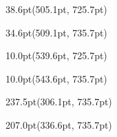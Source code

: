 \documentclass{article}
\begin{document}
\begin{textblock*}{38.6pt}(505.1pt, 725.7pt)%
\noindent%
%
\end{textblock*}
\begin{textblock*}{34.6pt}(509.1pt, 735.7pt)%
\noindent%
%
\end{textblock*}
\begin{textblock*}{10.0pt}(539.6pt, 725.7pt)%
\noindent%
%
\end{textblock*}
\begin{textblock*}{10.0pt}(543.6pt, 735.7pt)%
\noindent%
%
\end{textblock*}
\begin{textblock*}{237.5pt}(306.1pt, 735.7pt)%
\noindent%
%
\end{textblock*}
\begin{textblock*}{207.0pt}(336.6pt, 735.7pt)%
\noindent%
%
\end{textblock*}
\end{document}

